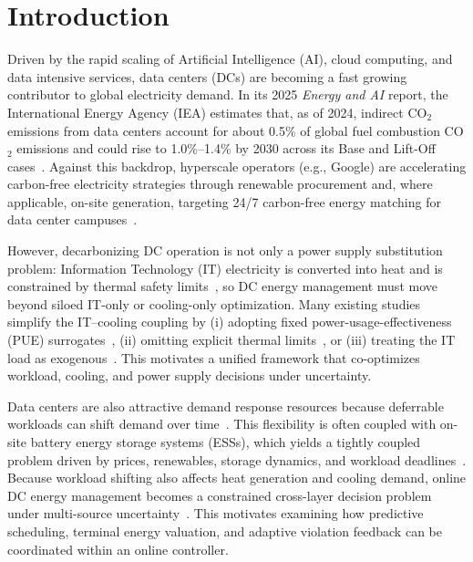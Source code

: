 \documentclass[a4paper,fleqn]{cas-dc}
\theoremstyle{plain}
\theoremstyle{remark}
\theoremstyle{plain}
\begin{document}
\section{Introduction}\label{sec:introduction}
Driven by the rapid scaling of Artificial Intelligence (AI), cloud computing, and data intensive services, data centers (DCs) are becoming a fast growing contributor to global electricity demand. In its 2025 \emph{Energy and AI} report, the International Energy Agency (IEA) estimates that, as of 2024, indirect CO$_2$ emissions from data centers account for about 0.5\% of global fuel combustion CO$_2$ emissions and could rise to 1.0\%--1.4\% by 2030 across its Base and Lift-Off cases~\cite{iea2025_energy_ai}. Against this backdrop, hyperscale operators (e.g., Google) are accelerating carbon-free electricity strategies through renewable procurement and, where applicable, on-site generation, targeting 24/7 carbon-free energy matching for data center campuses~\cite{google2025_environmental_report}.

However, decarbonizing DC operation is not only a power supply substitution problem: Information Technology (IT) electricity is converted into heat and is constrained by thermal safety limits~\cite{tang2008_thermal_aware_scheduling}, so DC energy management must move beyond siloed IT-only or cooling-only optimization. Many existing studies simplify the IT--cooling coupling by (i) adopting fixed power-usage-effectiveness (PUE) surrogates~\cite{ding2026_multi_time_scale_market}, (ii) omitting explicit thermal limits~\cite{lechowicz2023_online_pause_resume}, or (iii) treating the IT load as exogenous~\cite{lazic2018_dc_cooling_mpc}. This motivates a unified framework that co-optimizes workload, cooling, and power supply decisions under uncertainty.

Data centers are also attractive demand response resources because deferrable workloads can shift demand over time~\cite{liu2013_dr_coincident_peak}. This flexibility is often coupled with on-site battery energy storage systems (ESSs), which yields a tightly coupled problem driven by prices, renewables, storage dynamics, and workload deadlines~\cite{yu2018_distributed_realtime_dcmg}. Because workload shifting also affects heat generation and cooling demand, online DC energy management becomes a constrained cross-layer decision problem under multi-source uncertainty~\cite{xie2025_low_carbon_workload_thermal}. This motivates examining how predictive scheduling, terminal energy valuation, and adaptive violation feedback can be coordinated within an online controller.
\end{document}
